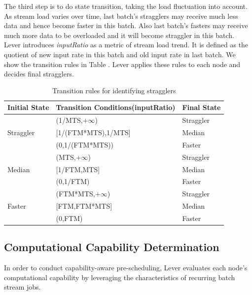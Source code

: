 \documentclass[10pt,conference,compsocconf,letterpaper]{IEEEtran}
\begin{document}
  The third step is to do state transition, taking the load fluctuation into account. As stream load varies over time, last batch's stragglers may receive much less data and hence become faster in this batch. Also last batch's fasters may receive much more data to be overloaded and it will become straggler in this batch. Lever introduces \emph{inputRatio} as a metric of stream load trend. It is defined as the quotient of new input rate in this batch and old input rate in last batch. We show the transition rules in Table \uppercase\expandafter{}. Lever applies these rules to each node and decides final stragglers.
  \begin{table}[htbp]
    \footnotesize
    \centering
    \caption{Transition rules for identifying stragglers}
    \begin{threeparttable}
    \centering
      \begin{tabular}{|p{1.5cm}|p{4.3cm}|p{1.4cm}|}
        \hline
        Initial State & Transition Conditions(inputRatio) & Final State \\
        \hline
        \multirow{3}{2cm}{Straggler} &
        (1/MTS,$+\infty$) & Straggler \\
        \cline{2-3}
        & [1/(FTM*MTS),1/MTS] & Median \\
        \cline{2-3}
        & (0,1/(FTM*MTS)) & Faster \\
        \hline
        \multirow{3}{2cm}{Median} &
        (MTS,$+\infty$) & Straggler \\
        \cline{2-3}
        & [1/FTM,MTS] & Median \\
        \cline{2-3}
        & (0,1/FTM) & Faster \\
        \hline
        \multirow{3}{2cm}{Faster} &
        (FTM*MTS,$+\infty$) & Straggler \\
        \cline{2-3}
        & [FTM,FTM*MTS] & Median \\
        \cline{2-3}
        & (0,FTM) & Faster \\
        \hline
      \end{tabular}
    \end{threeparttable}
    \label{Table1}
  \end{table}

\subsection{Computational Capability Determination}

  In order to conduct capability-aware pre-scheduling, Lever evaluates each node's computational capability by leveraging the characteristics of recurring batch stream jobs.
\end{document}
